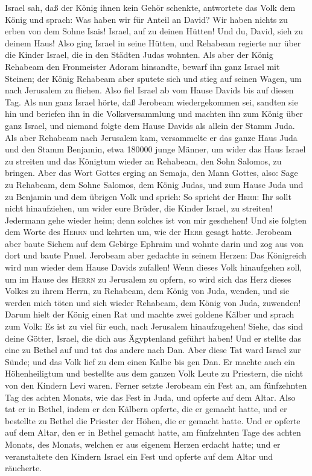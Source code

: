 Israel sah, daß der König ihnen kein Gehör schenkte, antwortete das Volk
dem König und sprach: Was haben wir für Anteil an David? Wir haben
nichts zu erben von dem Sohne Isais! Israel, auf zu deinen Hütten! Und
du, David, sieh zu deinem Haus!  Also ging Israel in
seine Hütten, und Rehabeam regierte nur über die Kinder Israel, die in
den Städten Judas wohnten.  Als aber der König Rehabeam
den Fronmeister Adoram hinsandte, bewarf ihn ganz Israel mit Steinen;
der König Rehabeam aber sputete sich und stieg auf seinen Wagen, um nach
Jerusalem zu fliehen.  Also fiel Israel ab vom Hause
Davids bis auf diesen Tag.  Als nun ganz Israel hörte,
daß Jerobeam wiedergekommen sei, sandten sie hin und beriefen ihn in die
Volksversammlung und machten ihn zum König über ganz Israel, und niemand
folgte dem Hause Davids als allein der Stamm Juda.  Als
aber Rehabeam nach Jerusalem kam, versammelte er das ganze Haus Juda und
den Stamm Benjamin, etwa 180000 junge Männer, um wider das Haus Israel
zu streiten und das Königtum wieder an Rehabeam, den Sohn Salomos, zu
bringen.  Aber das Wort Gottes erging an Semaja, den Mann
Gottes, also:  Sage zu Rehabeam, dem Sohne Salomos, dem
König Judas, und zum Hause Juda und zu Benjamin und dem übrigen Volk und
sprich:  So spricht der \textsc{Herr}: Ihr sollt nicht
hinaufziehen, um wider eure Brüder, die Kinder Israel, zu streiten!
Jedermann gehe wieder heim; denn solches ist von mir geschehen! Und sie
folgten dem Worte des \textsc{Herrn} und kehrten um, wie der
\textsc{Herr} gesagt hatte.  Jerobeam aber baute Sichem
auf dem Gebirge Ephraim und wohnte darin und zog aus von dort und baute
Pnuel.  Jerobeam aber gedachte in seinem Herzen: Das
Königreich wird nun wieder dem Hause Davids zufallen! 
Wenn dieses Volk hinaufgehen soll, um im Hause des \textsc{Herrn} zu
Jerusalem zu opfern, so wird sich das Herz dieses Volkes zu ihrem Herrn,
zu Rehabeam, dem König von Juda, wenden, und sie werden mich töten und
sich wieder Rehabeam, dem König von Juda, zuwenden! 
Darum hielt der König einen Rat und machte zwei goldene Kälber und
sprach zum Volk: Es ist zu viel für euch, nach Jerusalem hinaufzugehen!
Siehe, das sind deine Götter, Israel, die dich aus Ägyptenland geführt
haben!  Und er stellte das eine zu Bethel auf und tat das
andere nach Dan.  Aber diese Tat ward Israel zur Sünde;
und das Volk lief zu dem einen Kalbe bis gen Dan.  Er
machte auch ein Höhenheiligtum und bestellte aus dem ganzen Volk Leute
zu Priestern, die nicht von den Kindern Levi waren. 
Ferner setzte Jerobeam ein Fest an, am fünfzehnten Tag des achten
Monats, wie das Fest in Juda, und opferte auf dem Altar. Also tat er in
Bethel, indem er den Kälbern opferte, die er gemacht hatte, und er
bestellte zu Bethel die Priester der Höhen, die er gemacht hatte.
 Und er opferte auf dem Altar, den er in Bethel gemacht
hatte, am fünfzehnten Tage des achten Monats, des Monats, welchen er aus
eigenem Herzen erdacht hatte; und er veranstaltete den Kindern Israel
ein Fest und opferte auf dem Altar und räucherte.

